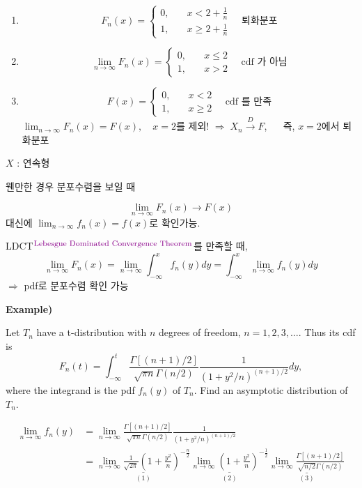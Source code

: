 \documentclass{oblivoir}
\newcommand{\DC}[1]{\textcolor{DarkMagenta}{#1}}%
\newcommand{\UP}[1]{$^{\mbox{\DC{\footnotesize #1}}}$}
\begin{document}
\begin{itemize}
\begin{enumerate}
\item
$$
F_n(x) = 
\begin{cases}
0, \quad & x < 2 + \frac{1}{n} \\
1, & x \geq 2 + \frac{1}{n}
\end{cases}
\quad \mbox{퇴화분포}
$$

\item
$$
\lim_{n \rightarrow \infty} F_n(x) =
\begin{cases}
0, \quad & x \leq 2 \\
1, & x > 2
\end{cases}
\quad \mbox{cdf 가 아님}
$$

\item
$$
F(x) =
\begin{cases}
0, \quad & x < 2 \\
1, & x \geq 2
\end{cases}
\quad \mbox{cdf 를 만족}
$$
$\lim_{n \rightarrow \infty} F_n(x) = F(x), \quad x=2$를 제외! $\Rightarrow \; X_n \overset{D}{\longrightarrow} F$, ~~ 즉, $x =2$에서 퇴화분포
\end{enumerate}

$X$ : 연속형

웬만한 경우 분포수렴을 보일 때

$$
\lim_{n \rightarrow \infty} F_n(x) \rightarrow F(x) 
$$
대신에 $\lim_{n \rightarrow \infty} f_n(x) = f(x)$로 확인가능.

LDCT\UP{Lebesgue Dominated Convergence Theorem}를 만족할 때,
$$
\lim_{n \rightarrow \infty} F_n(x) = \lim_{n \rightarrow \infty} \int_{-\infty}^x f_n(y) dy =  \int_{-\infty}^x \lim_{n \rightarrow \infty} f_n(y) dy
$$
$\Rightarrow$ pdf로 분포수렴 확인 가능

\textbf{Example)} 

Let $T_n$ have a t-distribution with $n$ degrees of freedom, $n = 1,2,3,\ldots$. Thus its cdf is
$$
F_n(t) = \int_{-\infty}^t \frac{\Gamma[(n+1) / 2]}{\sqrt{\pi n} \Gamma(n/2)} \frac{1}{(1 + y^2 / n)^{(n+1) / 2}} dy,
$$
where the integrand is the pdf $f_n(y)$ of $T_n$. Find an asymptotic distribution of $T_n$.

\begin{align*}
\lim_{n \rightarrow \infty} f_n(y) &= \lim_{n \rightarrow \infty} \frac{\Gamma[(n+1) / 2]}{\sqrt{\pi n} \Gamma(n/2)} \frac{1}{(1 + y^2 / n)^{(n+1) / 2}}\\
&= \underset{(1)}{\underline{\lim_{n \rightarrow \infty} \frac{1}{\sqrt{2\pi}} \left( 1 + \frac{y^2}{n} \right)^{-\frac{n}{2}} }} \underset{(2)}{\underline{\lim_{n \rightarrow \infty} \left( 1 + \frac{y^2}{n} \right)^{-\frac{1}{2}}}} \underset{(3)}{\underline{\lim_{n \rightarrow \infty}  \frac{\Gamma[(n+1) / 2]}{\sqrt{n/2} \Gamma(n/2)}}}
\end{align*}


\end{itemize}
\end{document}

